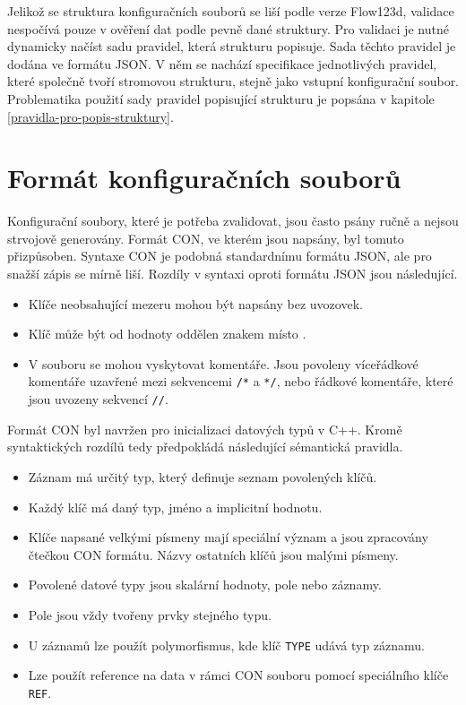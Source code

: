 \documentclass[FM,MP]{tulthesis}
\begin{document}
	Jelikož se struktura konfiguračních souborů se liší podle verze Flow123d, validace nespočívá pouze v ověření dat podle pevně dané struktury. Pro validaci je nutné dynamicky načíst sadu pravidel, která strukturu popisuje. Sada těchto pravidel je dodána ve formátu JSON. V něm se nachází specifikace jednotlivých pravidel, které společně tvoří stromovou strukturu, stejně jako vstupní konfigurační soubor. Problematika použití sady pravidel popisující strukturu je popsána v kapitole \ref{pravidla-pro-popis-struktury}.

\chapter{Formát konfiguračních souborů}
	Konfigurační soubory, které je potřeba zvalidovat, jsou často psány ručně a nejsou strvojově generovány. Formát CON, ve kterém jsou napsány, byl tomuto přizpůsoben. Syntaxe CON je podobná standardnímu formátu JSON, ale pro snažší zápis se mírně liší. Rozdíly v syntaxi oproti formátu JSON jsou následující.
	\begin{itemize}
		\item Klíče neobsahující mezeru mohou být napsány bez uvozovek.
		\item Klíč může být od hodnoty oddělen znakem \uv{\texttt{$=$}} místo \uv{\texttt{$:$}}.
		\item V souboru se mohou vyskytovat komentáře. Jsou povoleny víceřádkové komentáře uzavřené mezi sekvencemi \texttt{/*} a \texttt{*/}, nebo řádkové komentáře, které jsou uvozeny sekvencí \texttt{//}.
	\end{itemize}


	\label{semantika-con}
	Formát CON byl navržen pro inicializaci datových typů v C++. Kromě syntaktických rozdílů tedy předpokládá následující sémantická pravidla.
	\begin{itemize}
		\item Záznam má určitý typ, který definuje seznam povolených klíčů.
		\item Každý klíč má daný typ, jméno a implicitní hodnotu.
		\item Klíče napsané velkými písmeny mají speciální význam a jsou zpracovány čtečkou CON formátu. Názvy ostatních klíčů jsou malými písmeny.
		\item Povolené datové typy jsou skalární hodnoty, pole nebo záznamy.
		\item Pole jsou vždy tvořeny prvky stejného typu.
		\item U záznamů lze použít polymorfismus, kde klíč \texttt{TYPE} udává typ záznamu.
		\item Lze použít reference na data v rámci CON souboru pomocí speciálního klíče \texttt{REF}.
	\end{itemize}
\end{document}
